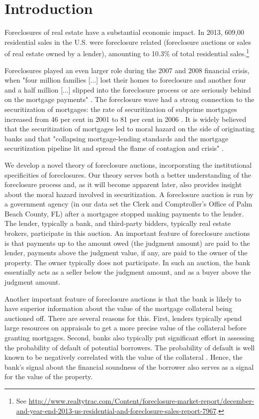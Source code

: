 \documentclass[11pt,twopage]{article}
\newcommand{\AN}[1]{\textcolor{red}{[AN: #1]}}
\begin{document}
\section{Introduction}

Foreclosures of real estate have a substantial economic impact. In
2013, 609,00 residential sales in the U.S. were foreclosure related
(foreclosure auctions or sales of real estate owned by a lender),
amounting to 10.3\% of total residential sales.\footnote{See
  \url{http://www.realtytrac.com/Content/foreclosure-market-report/december-and-year-end-2013-us-residential-and-foreclosure-sales-report-7967}.}

Foreclosures played an even larger role during the 2007 and 2008
financial crisis, when "four million families [...] lost their homes
to foreclosure and another four and a half million [...] slipped into
the foreclosure process or are seriously behind on the mortgage
payments" \cite[p. xv]{angelides2011financial}. The foreclosure wave had
a strong connection to the securitization of mortgages: the rate of
securitization of subprime mortgages increased from 46 per cent in
2001 to 81 per cent in 2006 \cite[p. 19]{dewatripont2010balancing}. It is widely
believed that the securitization of mortgages led to moral hazard on
the side of originating banks and that "collapsing mortgage-lending
standards and the mortgage securitization pipeline lit and spread the
flame of contagion and crisis" \cite[p. xxiii]{angelides2011financial}.

We develop a novel theory of foreclosure auctions, incorporating the
institutional specificities of foreclosures. Our theory serves both a
better understanding of the foreclosure process and, as it will become
apparent later, also provides insight about the moral hazard involved
in securitization. A foreclosure auction is run by a government agency
(in our data set the Clerk and Comptroller's Office of Palm Beach
County, FL) after a mortgagee stopped making payments to the
lender. The lender, typically a bank, and third-party bidders,
typically real estate brokers, participate in this auction. An
important feature of foreclosure auctions is that payments up to the
amount owed (the judgment amount) are paid to the lender, payments
above the judgment value, if any, are paid to the owner of the
property. The owner typically does not participate. In such an
auction, the bank essentially acts as a seller below the judgment
amount, and as a buyer above the judgment amount.

Another important feature of foreclosure auctions is that the bank is
likely to have superior information about the value of the mortgage
collateral being auctioned off. There are several reasons for
this. First, lenders typically spend large resources on appraisals to
get a more precise value of the collateral before granting
mortgages. %
Second, banks also typically put
significant effort in assessing the probability of default of
potential borrowers. The probability of default is well known to be
negatively correlated with the value of the collateral \cite[see][and the references therein]{qi2009loss}. Hence, the bank's signal about
the financial soundness of the borrower also serves as a signal for
the value of the property.
\end{document}
